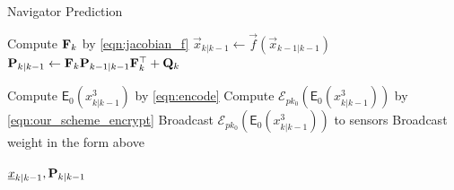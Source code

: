 \documentclass[10pt,letterpaper,oneside,twocolumn,journal]{IEEEtran}
\theoremstyle{definition}
\theoremstyle{definition}
\theoremstyle{remark}
\begin{document}
\begin{algorithm}[htbp]
\caption{Navigator Prediction}\label{alg:nav_prediction}
\begin{algorithmic}[1]

    \State Compute ${{\mathbf{F}}}_k$ by \eqref{eqn:jacobian_f}
    \State $\vec{x}_{k|k-1} \gets \vec{f}(\vec{x}_{k-1|k-1})$
    \State ${{\mathbf{P}}}_{k|k-1} \gets {\ensuremath{{\mathbf{F}}}}_k{{\mathbf{P}}}_{k-1|k-1}{{\mathbf{F}}}_k^\top + {{\mathbf{Q}}}_k$

    \State Compute $\mathsf{E}_{0}(x^3_{k|k-1})$ by \eqref{eqn:encode}
    \State Compute $\mathcal{E}_{pk_0}(\mathsf{E}_{0}(x^3_{k|k-1}))$ by \eqref{eqn:our_scheme_encrypt}
    \State Broadcast $\mathcal{E}_{pk_0}(\mathsf{E}_{0}(x^3_{k|k-1}))$ to sensors
        \State Broadcast weight in the form above
    \EndFor

    \State \Return ${\underline{x}}_{k|k-1}, {{\mathbf{P}}}_{k|k-1}$
    \EndProcedure
\end{algorithmic}
\end{algorithm}
\end{document}
